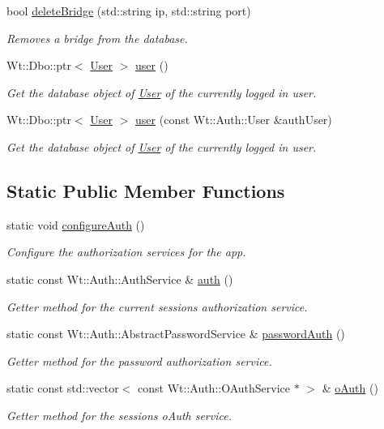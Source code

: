 \begin{DoxyCompactItemize}
bool \hyperlink{classSession_ab227752536d56a50a7b54373098dccd3}{delete\+Bridge} (std\+::string ip, std\+::string port)
\begin{DoxyCompactList}\small\item\em Removes a bridge from the database. \end{DoxyCompactList}\item 
Wt\+::\+Dbo\+::ptr$<$ \hyperlink{classUser}{User} $>$ \hyperlink{classSession_a8869e1a43a0131699f9dc234c96b45c9}{user} ()
\begin{DoxyCompactList}\small\item\em Get the database object of \hyperlink{classUser}{User} of the currently logged in user. \end{DoxyCompactList}\item 
Wt\+::\+Dbo\+::ptr$<$ \hyperlink{classUser}{User} $>$ \hyperlink{classSession_af4b107688e55ec0614d8181688c7dee7}{user} (const Wt\+::\+Auth\+::\+User \&auth\+User)
\begin{DoxyCompactList}\small\item\em Get the database object of \hyperlink{classUser}{User} of the currently logged in user. \end{DoxyCompactList}\end{DoxyCompactItemize}
\subsection*{Static Public Member Functions}
\begin{DoxyCompactItemize}
\item 
static void \hyperlink{classSession_a02ee7e0bfcaf6470f35661ec30b8cf8b}{configure\+Auth} ()
\begin{DoxyCompactList}\small\item\em Configure the authorization services for the app. \end{DoxyCompactList}\item 
static const Wt\+::\+Auth\+::\+Auth\+Service \& \hyperlink{classSession_a7fe071d1b3aee64cdf9f3601cdeb42fb}{auth} ()
\begin{DoxyCompactList}\small\item\em Getter method for the current sessions authorization service. \end{DoxyCompactList}\item 
static const Wt\+::\+Auth\+::\+Abstract\+Password\+Service \& \hyperlink{classSession_a06fdfd453428ecbe0e1cce81470bca69}{password\+Auth} ()
\begin{DoxyCompactList}\small\item\em Getter method for the password authorization service. \end{DoxyCompactList}\item 
static const std\+::vector$<$ const Wt\+::\+Auth\+::\+O\+Auth\+Service $\ast$ $>$ \& \hyperlink{classSession_a22252a55fec95eec790ca74ce9559a54}{o\+Auth} ()
\begin{DoxyCompactList}\small\item\em Getter method for the sessions o\+Auth service. \end{DoxyCompactList}\end{DoxyCompactItemize}
